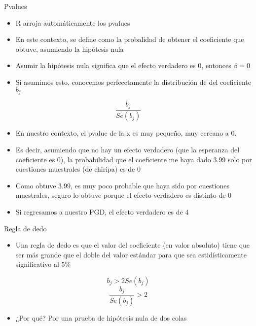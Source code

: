 \documentclass[
  ignorenonframetext,
]{beamer}
\providecommand{\tightlist}{%
  \setlength{\itemsep}{0pt}\setlength{\parskip}{0pt}}
\begin{document}
\begin{frame}{Pvalues}
\protect\hypertarget{pvalues}{}
\begin{itemize}
\tightlist
\item
  R arroja automáticamente los pvalues
\item
  En este contexto, se define como la probalidad de obtener el
  coeficiente que obtuve, asumiendo la hipótesis nula
\item
  Asumir la hipótesis nula significa que el efecto verdadero es 0,
  entonces \(\beta = 0\)
\item
  Si asumimos esto, conocemos perfecetamente la distribución de del
  coeficiente \(b_j\)
\end{itemize}

\[\frac{b_j}{Se(b_j)}\]
\end{frame}

\begin{frame}{}
\protect\hypertarget{section-19}{}
\begin{itemize}
\tightlist
\item
  En nuestro contexto, el pvalue de la x es muy pequeño, muy cercano a
  0.
\item
  Es decir, asumiendo que no hay un efecto verdadero (que la esperanza
  del coeficiente es 0), la probabilidad que el coeficiente me haya dado
  3.99 solo por cuestiones muestrales (de chiripa) es de 0
\item
  Como obtuve 3.99, es muy poco probable que haya sido por cuestiones
  muestrales, seguro lo obtuve porque el efecto verdadero es distinto de
  0
\item
  Si regresamos a nuestro PGD, el efecto verdadero es de 4
\end{itemize}
\end{frame}

\begin{frame}{Regla de dedo}
\protect\hypertarget{regla-de-dedo}{}
\begin{itemize}
\tightlist
\item
  Una regla de dedo es que el valor del coeficiente (en valor absoluto)
  tiene que ser más grande que el doble del valor estándar para que sea
  estidísticamente significativo al 5\%
\end{itemize}

\[ b_j > 2 Se (b_j)\] \[\frac{b_j}{Se(b_j)} > 2\]

\begin{itemize}
\tightlist
\item
  ¿Por qué? Por una prueba de hipótesis nula de dos colas
\end{itemize}
\end{frame}
\end{document}
